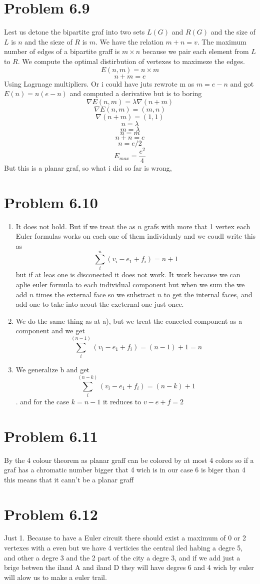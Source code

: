 \documentclass[12pt]{article}
\begin{document}
\section*{Problem 6.9}
Lest us detone the bipartite graf into two sets $L(G)$ and $R(G)$ and the size of $L$ is $n$ and the sieze of $R$ is $m$. We have the relation $m+n=v$. The maximum number of edges of a bipartite graff is $m \times n$ because we pair each element from $L$ to $R$. We compute the optimal distirbution of vertexes to maximeze the edges.
\[E(n, m)= n\times m\]
\[n+m=e\]
Using Lagrnage multipliers. Or i could have juts rewrote m as \(m=e-n\) and got \(E(n)=n(e-n)\) and computed a derivative but is to boring
\[\nabla E(n, m) = \lambda \nabla(n+m)\]
\[\nabla E(n, m) = (m, n)\]
\[\nabla (n+m) = (1, 1)\]
\[n=\lambda\]
\[m=\lambda\]
\[n=m\]
\[n+n=e\]
\[n=e/2\]
\[E_{max}=\frac{e^2}{4}\]
But this is a planar graf, so what i did so far is wrong,
\section*{Problem 6.10}
\begin{enumerate}[label=\alph*)]
	\item It does not hold. But if we treat the as $n$ grafs with more that 1 vertex each Euler formulas works on each one of them individualy and we coudl write this as \[\sum^n_i(v_i-e_1+f_i)=n+1\] but if at leas one is disconected it does not work. It work because we can aplie euler formula to each individual component but when we sum the we add $n$ times the external face so we substract $n$ to get the internal faces, and add one to take into acout the exeternal one just once.
	\item We do the same thing as at a), but we treat the conected component as a component and we get \[\sum^(n-1)_i(v_i-e_1+f_i)=(n-1)+1=n\]
	\item We generalize b and get \[\sum^(n-k)_i(v_i-e_1+f_i)=(n-k)+1\]. and for the case \(k=n-1\) it reduces to $v-e+f=2$
\end{enumerate}

\section*{Problem 6.11}
By the 4 colour theorem as planar graff can be colored by at most 4 colors so if a graf has a chromatic number bigger that 4 wich is in our case 6 is biger than 4 this means that it cann't be a planar graff

\section*{Problem 6.12}
Just 1. Because to have a Euler circuit there should exist a maximum of 0 or 2 vertexes with a even but we have 4 verticies the central iled habing a degre 5, and other a degre 3 and the 2 part of the city a degre 3, and if we add just a brige betwen the iland A and iland D they will have degres 6 and 4 wich by euler will alow us to make a euler trail.
\end{document}
